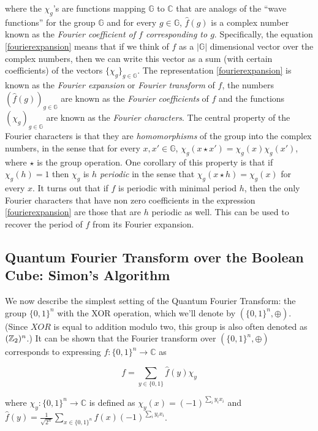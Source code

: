 where the \(\chi_g\)'s are functions mapping \(\mathbb{G}\) to
\(\mathbb{C}\) that are analogs of the ``wave functions'' for the group
\(\mathbb{G}\) and for every \(g\in \mathbb{G}\), \(\hat{f}(g)\) is a
complex number known as the \emph{Fourier coefficient of \(f\)
corresponding to \(g\)}. Specifically, the equation
\eqref{fourierexpansion} means that if we think of \(f\) as a
\(|\mathbb{G}|\) dimensional vector over the complex numbers, then we
can write this vector as a sum (with certain coefficients) of the
vectors \(\{ \chi_g \}_{g\in \mathbb{G}}\). The representation
\eqref{fourierexpansion} is known as the \emph{Fourier expansion} or
\emph{Fourier transform} of \(f\), the numbers
\(( \hat{f}(g) )_{g\in\mathbb{G}}\) are known as the \emph{Fourier
coefficients} of \(f\) and the functions \(( \chi_g )_{g\in\mathbb{G}}\)
are known as the \emph{Fourier characters}. The central property of the
Fourier characters is that they are \emph{homomorphisms} of the group
into the complex numbers, in the sense that for every
\(x,x' \in \mathbb{G}\), \(\chi_g(x \star x')=\chi_g(x)\chi_g(x')\),
where \(\star\) is the group operation. One corollary of this property
is that if \(\chi_g(h)=1\) then \(\chi_g\) is \emph{\(h\) periodic} in
the sense that \(\chi_g(x \star h)=\chi_g(x)\) for every \(x\). It turns
out that if \(f\) is periodic with minimal period \(h\), then the only
Fourier characters that have non zero coefficients in the expression
\eqref{fourierexpansion} are those that are \(h\) periodic as well. This
can be used to recover the period of \(f\) from its Fourier expansion.

\subsection{Quantum Fourier Transform over the Boolean Cube: Simon's
Algorithm}\label{Quantum-Fourier-Transform}

We now describe the simplest setting of the Quantum Fourier Transform:
the group \(\{0,1\}^n\) with the XOR operation, which we'll denote by
\((\{0,1\}^n,\oplus)\). (Since \(\ensuremath{\mathit{XOR}}\) is equal to
addition modulo two, this group is also often denoted as \(({\mathbb{Z}}_2)^n\).)
It can be shown that the Fourier transform over \((\{0,1\}^n,\oplus)\)
corresponds to expressing \(f:\{0,1\}^n \rightarrow \mathbb{C}\) as

\[
f = \sum_{y\in \{0,1\}} \hat{f}(y) \chi_y
\]

where \(\chi_y:\{0,1\}^n \rightarrow \mathbb{C}\) is defined as
\(\chi_y(x) = (-1)^{\sum_i y_i x_i}\) and
\(\hat{f}(y) = \tfrac{1}{\sqrt{2^n}}\sum_{x\in \{0,1\}^n} f(x)(-1)^{\sum_i y_i x_i}\).

